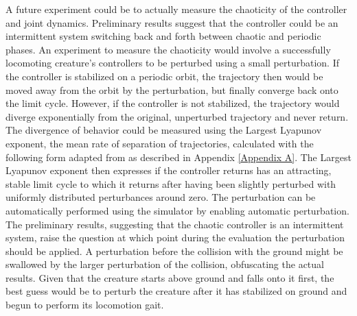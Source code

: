 \documentclass[main]{subfiles}
\begin{document}
A future experiment could be to actually measure the chaoticity of the controller and joint dynamics. %
%
Preliminary results suggest that the controller could be an intermittent system switching back and forth between chaotic and periodic phases. %
%
An experiment to measure the chaoticity would involve a successfully locomoting creature's controllers to be perturbed using a small perturbation. %
%
If the controller is stabilized on a periodic orbit, the trajectory then would be moved away from the orbit by the perturbation, but finally converge back onto the limit cycle. %
%
However, if the controller is not stabilized, the trajectory would diverge exponentially from the original, unperturbed trajectory and never return. %
%
The divergence of behavior could be measured using the Largest Lyapunov exponent, the mean rate of separation of trajectories, calculated with the following form adapted from \cite{bib:Rosenstein1993} as described in Appendix \ref{Appendix A}.%
%
The Largest Lyapunov exponent then expresses if the controller returns has an attracting, stable limit cycle to which it returns after having been slightly perturbed with uniformly distributed perturbances around zero.%
%
The perturbation can be automatically performed using the simulator by enabling automatic perturbation. %
%
The preliminary results, suggesting that the chaotic controller is an intermittent system, raise the question at which point during the evaluation the perturbation should be applied. %
%
A perturbation before the collision with the ground might be swallowed by the larger perturbation of the collision, obfuscating the actual results. %
%
Given that the creature starts above ground and falls onto it first, the best guess would be to perturb the creature after it has stabilized on ground and begun to perform its locomotion gait. 
\end{document}

